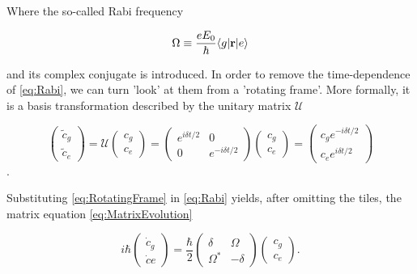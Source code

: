Where the so-called Rabi frequency 

\begin{equation}\label{eq:RabiFrequency}
	\Omega \equiv \frac{e E_0}{\hbar} \langle g\rvert\mathbf{r}\lvert e\rangle
\end{equation}

and its complex conjugate is introduced. In order to remove the time-dependence of \cref{eq:Rabi}, we can turn 'look' at them from a 'rotating frame'. More formally, it is a basis transformation described by the unitary matrix $\mathcal{U}$ \cite{Foot2005}

\begin{equation}\label{eq:RotatingFrame}
	\begin{pmatrix}
		\tilde{c}_g \\ 
		\tilde{c}_e
	\end{pmatrix} =
	\mathcal{U}
	\begin{pmatrix}
		c_g \\
		c_e
	\end{pmatrix} =
	\begin{pmatrix}
		e^{i \delta t/2} & 0\\
		0 & e^{-i \delta t/2}
	\end{pmatrix}
	\begin{pmatrix}
		c_g \\
		c_e
	\end{pmatrix} =
	\begin{pmatrix}
		c_g e^{-i\delta t/2}\\
		c_e e^{i \delta t/2}
	\end{pmatrix}
\end{equation}.

Substituting \cref{eq:RotatingFrame} in \cref{eq:Rabi} yields, after omitting the tiles, the matrix equation \cref{eq:MatrixEvolution}

\begin{equation}
	i \hbar \begin{pmatrix}
		\dot{c}_g \\ 
		\dot{c}e
	\end{pmatrix}
	= \frac{\hbar}{2} \begin{pmatrix}
		\delta & \Omega \\ \Omega^* & -\delta 
	\end{pmatrix} 
	\begin{pmatrix}
		c_g \\ c_e
	\end{pmatrix}.
\end{equation}



